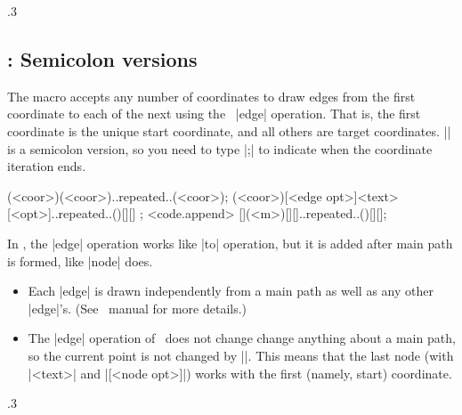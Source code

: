 \begin{tzcode}{.3}
\end{tzcode}

\subsection{\protect\cmd{\tzedges(+)}: Semicolon versions}
\label{ss:tzedges}

The macro \icmd{\tzedges} accepts any number of coordinates to draw edges from the first coordinate to each of the next using the \Tikz\ |edge| operation. That is, the first coordinate is the unique start coordinate, and all others are target coordinates.
|\tzedges| is a semicolon version, so you need to type |;| to indicate when the coordinate iteration ends.


\begin{tzdef}{}
\tzedges(<coor>)(<coor>)..repeated..(<coor>);
        (<coor>)[<edge opt>]{<text>}[<opt>]..repeated..()[]{}[] ; <code.append>
  [](<m>)[]{}[]..repeated..()[]{}[];
\end{tzdef}

\remark In \Tikz, the |edge| operation works like |to| operation, but it is added after main path is formed, like |node| does.
\begin{itemize}\firmlist
\item Each |edge| is drawn independently from a main path as well as any other |edge|'s. (See \Tikz\ manual for more details.)
\item The |edge| operation of \Tikz\ does not change change anything about a main path, so the current point is not changed by |\tzedges|. This means that the last node (with |{<text>}| and |[<node opt>]|) works with the first (namely, start) coordinate.
\end{itemize}





\begin{tzcode}{.3}
{}
\end{tzcode}

